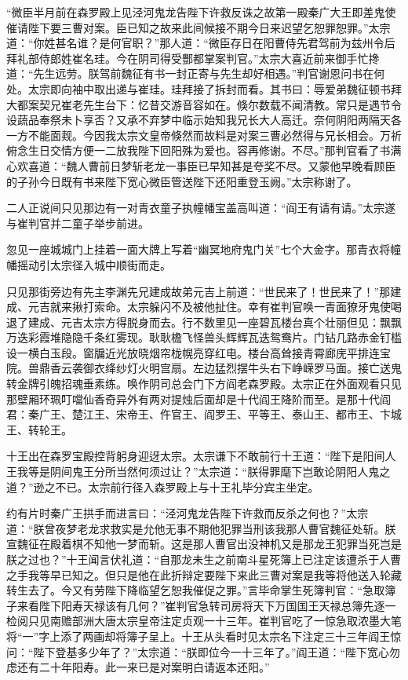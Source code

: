 \documentclass[12pt,UTF8]{ctexbook}
\begin{document}
{“微臣半月前在森罗殿上见泾河鬼龙告陛下许救反诛之故第一殿秦广大王即差鬼使催请陛下要三曹对案。臣已知之故来此间候接不期今日来迟望乞恕罪恕罪。”太宗道：“你姓甚名谁？是何官职？”那人道：“微臣存日在阳曹侍先君驾前为兹州令后拜礼部侍郎姓崔名珪。今在阴司得受酆都掌案判官。”太宗大喜近前来御手忙搀道：“先生远劳。朕驾前魏征有书一封正寄与先生却好相遇。”判官谢恩问书在何处。太宗即向袖中取出递与崔珪。珪拜接了拆封而看。其书曰：辱爱弟魏征顿书拜大都案契兄崔老先生台下：忆昔交游音容如在。倏尔数载不闻清教。常只是遇节令设蔬品奉祭未卜享否？又承不弃梦中临示始知我兄长大人高迁。奈何阴阳两隔天各一方不能面觌。今因我太宗文皇帝倏然而故料是对案三曹必然得与兄长相会。万祈俯念生日交情方便一二放我陛下回阳殊为爱也。容再修谢。不尽。”那判官看了书满心欢喜道：“魏人曹前日梦斩老龙一事臣已早知甚是夸奖不尽。又蒙他早晚看顾臣的子孙今日既有书来陛下宽心微臣管送陛下还阳重登玉阙。”太宗称谢了。

二人正说间只见那边有一对青衣童子执幢幡宝盖高叫道：“阎王有请有请。”太宗遂与崔判官并二童子举步前进。

忽见一座城城门上挂着一面大牌上写着“幽冥地府鬼门关”七个大金字。那青衣将幢幡摇动引太宗径入城中顺街而走。

只见那街旁边有先主李渊先兄建成故弟元吉上前道：“世民来了！世民来了！”那建成、元吉就来揪打索命。太宗躲闪不及被他扯住。幸有崔判官唤一青面獠牙鬼使喝退了建成、元吉太宗方得脱身而去。行不数里见一座碧瓦楼台真个壮丽但见：飘飘万迭彩霞堆隐隐千条红雾现。耿耿檐飞怪兽头辉辉瓦迭鸳鸯片。门钻几路赤金钉槛设一横白玉段。窗牖近光放晓烟帘栊幌亮穿红电。楼台高耸接青霄廊庑平排连宝院。兽鼎香云袭御衣绛纱灯火明宫扇。左边猛烈摆牛头右下峥嵘罗马面。接亡送鬼转金牌引魄招魂垂素练。唤作阴司总会门下方阎老森罗殿。太宗正在外面观看只见那壁厢环珮叮噹仙香奇异外有两对提烛后面却是十代阎王降阶而至。是那十代阎君：秦广王、楚江王、宋帝王、仵官王、阎罗王、平等王、泰山王、都市王、卞城王、转轮王。

十王出在森罗宝殿控背躬身迎迓太宗。太宗谦下不敢前行十王道：“陛下是阳间人王我等是阴间鬼王分所当然何须过让？”太宗道：“朕得罪麾下岂敢论阴阳人鬼之道？”逊之不已。太宗前行径入森罗殿上与十王礼毕分宾主坐定。

约有片时秦广王拱手而进言曰：“泾河鬼龙告陛下许救而反杀之何也？”太宗道：“朕曾夜梦老龙求救实是允他无事不期他犯罪当刑该我那人曹官魏征处斩。朕宣魏征在殿着棋不知他一梦而斩。这是那人曹官出没神机又是那龙王犯罪当死岂是朕之过也？”十王闻言伏礼道：“自那龙未生之前南斗星死簿上已注定该遭杀于人曹之手我等早已知之。但只是他在此折辩定要陛下来此三曹对案是我等将他送入轮藏转生去了。今又有劳陛下降临望乞恕我催促之罪。”言毕命掌生死簿判官：“急取簿子来看陛下阳寿天禄该有几何？”崔判官急转司房将天下万国国王天禄总簿先逐一检阅只见南赡部洲大唐太宗皇帝注定贞观一十三年。崔判官吃了一惊急取浓墨大笔将“一”字上添了两画却将簿子呈上。十王从头看时见太宗名下注定三十三年阎王惊问：“陛下登基多少年了？”太宗道：“朕即位今一十三年了。”阎王道：“陛下宽心勿虑还有二十年阳寿。此一来已是对案明白请返本还阳。”

}
\end{document}
